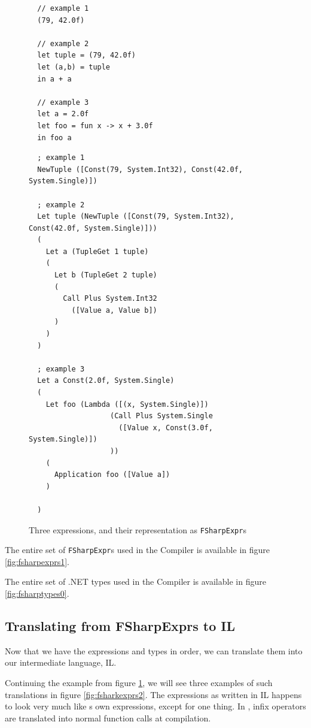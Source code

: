 \begin{figure}[H]
  \centering
\begin{verbatim}
  // example 1
  (79, 42.0f)

  // example 2
  let tuple = (79, 42.0f)
  let (a,b) = tuple
  in a + a

  // example 3
  let a = 2.0f
  let foo = fun x -> x + 3.0f
  in foo a
\end{verbatim}

\begin{verbatim}
  ; example 1
  NewTuple ([Const(79, System.Int32), Const(42.0f, System.Single)])

  ; example 2
  Let tuple (NewTuple ([Const(79, System.Int32), Const(42.0f, System.Single)]))
  ( 
    Let a (TupleGet 1 tuple) 
    (
      Let b (TupleGet 2 tuple) 
      (
        Call Plus System.Int32 
          ([Value a, Value b])
      )       
    )
  )

  ; example 3
  Let a Const(2.0f, System.Single)
  (
    Let foo (Lambda ([(x, System.Single)]) 
                   (Call Plus System.Single 
                     ([Value x, Const(3.0f, System.Single)])
                   ))
    (
      Application foo ([Value a])
    )

  )
\end{verbatim}
  \caption{Three \fsharp{} expressions, and their representation as
    \texttt{FSharpExpr}s}
  \label{fig:fsharpexprs0}
\end{figure}

The entire set of \texttt{FSharpExpr}s used in the \fshark{}Compiler is
available in figure \ref{fig:fsharpexprs1}.

The entire set of .NET types used in the \fshark{}Compiler is
available in figure \ref{fig:fsharptypes0}.

\subsection{Translating from FSharpExprs to \fshark{}IL}
Now that we have the \fsharp{} expressions and types in order, we can translate
them into our \fshark{} intermediate language, \fshark{}IL.

Continuing the example from figure \ref{fig:fsharpexprs0}, we will see three
examples of such translations in figure \ref{fig:fsharkexprs2}.
The expressions as written in \fshark{}IL happens to look very much like \fshark{}s own
expressions, except for one thing. In \fsharp{}, infix operators are translated
into normal function calls at compilation.

